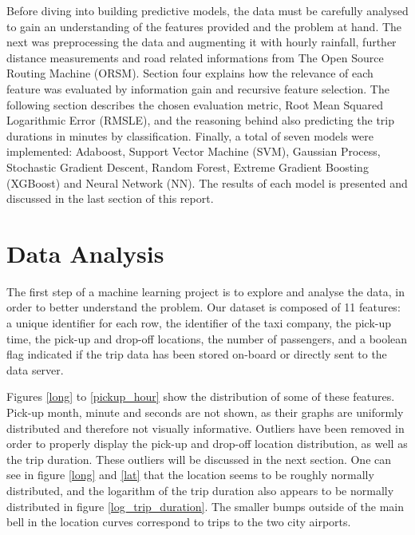 \documentclass[a4paper]{article}
\begin{document}
Before diving into building predictive models, the data must be carefully
analysed to gain an understanding of the features provided and the problem at
hand. The next was preprocessing the data and augmenting it with hourly
rainfall, further distance measurements and road related informations from The
Open Source Routing Machine (ORSM). Section four explains how the relevance of
each feature was evaluated by information gain and recursive feature selection.
The following section describes the chosen evaluation metric, Root Mean Squared
Logarithmic Error (RMSLE), and the reasoning behind also predicting the trip
durations in minutes by classification. Finally, a total of seven models were
implemented: Adaboost, Support Vector Machine (SVM), Gaussian Process,
Stochastic Gradient Descent, Random Forest, Extreme Gradient Boosting (XGBoost)
and Neural Network (NN). The results of each model is presented and discussed in
the last section of this report.


\section{Data Analysis}
The first step of a machine learning project is to explore and analyse the data,
in order to better understand the problem. Our dataset is composed of 11
features: a unique identifier for each row, the identifier of the taxi company,
the pick-up time, the pick-up and drop-off locations, the number of passengers,
and a boolean flag indicated if the trip data has been stored on-board or
directly sent to the data server.

Figures \ref{long} to \ref{pickup_hour} show the distribution of some of these
features. Pick-up month, minute and seconds are not shown, as their graphs
are uniformly distributed and therefore not visually informative. Outliers have
been removed in order to properly display the pick-up and drop-off location
distribution, as well as the trip duration. These outliers will be discussed in
the next section. One can see in figure \ref{long} and \ref{lat} that the
location seems to be roughly normally distributed, and the logarithm of the trip
duration also appears to be normally distributed in figure
\ref{log_trip_duration}. The smaller bumps outside of the main bell in the
location curves correspond to trips to the two city airports.
\end{document}

